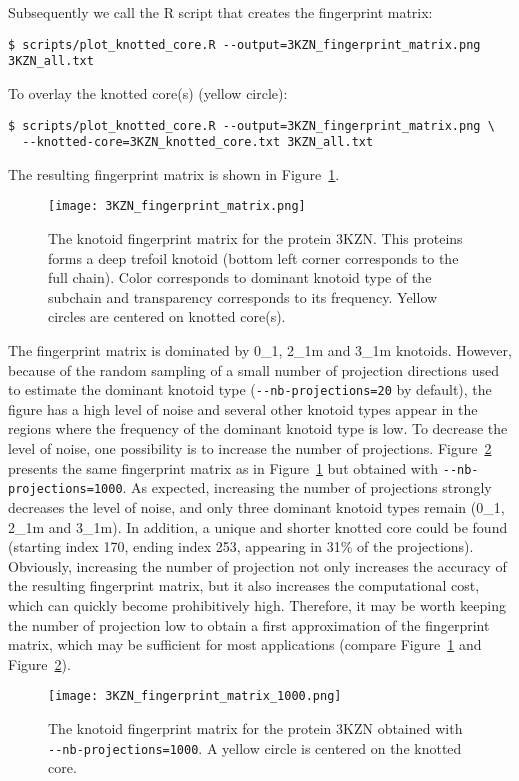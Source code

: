 Subsequently we call the {\ttfamily R} script that creates the fingerprint matrix:
\begin{lstlisting}
$ scripts/plot_knotted_core.R --output=3KZN_fingerprint_matrix.png 3KZN_all.txt
\end{lstlisting}
To overlay the knotted core(s) (yellow circle):
\begin{lstlisting}
$ scripts/plot_knotted_core.R --output=3KZN_fingerprint_matrix.png \
  --knotted-core=3KZN_knotted_core.txt 3KZN_all.txt 
\end{lstlisting}
The resulting fingerprint matrix is shown in Figure~\ref{fig:3KZN:fingerprint}.
\begin{figure}[t]
\centering
\texttt{[image: 3KZN\_fingerprint\_matrix.png]}
\caption{The knotoid fingerprint matrix for the protein 3KZN. This proteins forms a deep trefoil knotoid (bottom left corner corresponds to the full chain). Color corresponds to dominant knotoid type of the subchain and transparency corresponds to its frequency. Yellow circles are centered on knotted core(s).}\label{fig:3KZN:fingerprint}
\end{figure}
The fingerprint matrix is dominated by 0\_1, 2\_1m and 3\_1m knotoids. However, because of the random sampling of a small number of projection directions used to estimate the dominant knotoid type (\lstinline{--nb-projections=20} by default), the figure has a high level of noise and several other knotoid types appear in the regions where the frequency of the dominant knotoid type is low. To decrease the level of noise, one possibility is to increase the number of projections. Figure~\ref{fig:3KZN:fingerprint1000} presents the same fingerprint matrix as in Figure~\ref{fig:3KZN:fingerprint} but obtained with \lstinline{--nb-projections=1000}. As expected, increasing the number of projections strongly decreases the level of noise, and only three dominant knotoid types remain (0\_1, 2\_1m and 3\_1m). In addition, a unique and shorter knotted core could be found (starting index 170, ending index 253, appearing in 31\% of the projections).
Obviously, increasing the number of projection not only increases the accuracy of the resulting fingerprint matrix, but it also increases the computational cost, which can quickly become prohibitively high. Therefore, it may be worth keeping the number of projection low to obtain a first approximation of the fingerprint matrix, which may be sufficient for most applications (compare Figure~\ref{fig:3KZN:fingerprint} and Figure~\ref{fig:3KZN:fingerprint1000}). 
\begin{figure}[t]
\centering
\texttt{[image: 3KZN\_fingerprint\_matrix\_1000.png]}
\caption{The knotoid fingerprint matrix for the protein 3KZN obtained with \lstinline{--nb-projections=1000}. A yellow circle is centered on the knotted core.}\label{fig:3KZN:fingerprint1000}
\end{figure}

